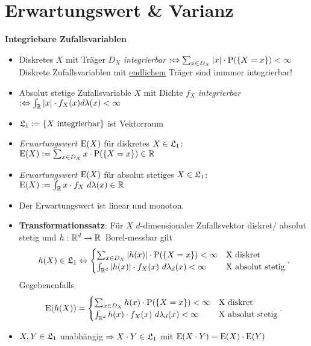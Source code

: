 \section{Erwartungswert \& Varianz}

\textbf{Integriebare Zufallsvariablen}
\begin{itemize}
\item Diskretes $X$ mit Träger $D_X$ \textit{integrierbar}
$:\Leftrightarrow \sum_{x\in D_X} |x|\cdot \P(\{X=x\})<\infty$\\
Diskrete Zufallsvariablen mit \underline{endlichem} Träger sind immmer integrierbar!

\item  Absolut stetige Zufallsvariable $X$ mit Dichte $f_X$ \textit{integrierbar}
\mbox{$:\Leftrightarrow \int_\R |x|\cdot f_X(x)d\lambda(x)<\infty$}

\item $\L_1:=\{X \text{ integrierbar}\}$ ist Vektorraum

\item \textit{Erwartungswert $\E(X)$} für diskretes $X\in\L_1$:
$\E(X):= \sum_{x\in D_X} x\cdot\P(\{X=x\})\in\R$

\item \textit{Erwartungswert $\E(X)$} für absolut stetiges $X\in\L_1$:
$\E(X):= \int_\R x\cdot f_X~d\lambda(x)\in\R$

\item Der Erwartungswert ist linear und monoton.

\item \textbf{Transformationssatz}: Für $X$ $d$-dimensionaler Zufallsvektor diskret/
absolut stetig und \mbox{$h:\R^d\to\R$ Borel-messbar} gilt
\[
	h(X)\in\L_1 \Leftrightarrow
	\begin{cases}
	\sum_{x\in D_X} |h(x)|\cdot\P(\{X=x\})<\infty			& \text{X diskret} \\
	\int_{\R^d} |h(x)|\cdot f_X(x)~d\lambda_d(x)<\infty	& \text{X absolut stetig}
	\end{cases}.
\]
Gegebenenfalls
\[
	\E(h(X))=
	\begin{cases}
	\sum_{x\in D_X} h(x)\cdot\P(\{X=x\})<\infty			& \text{X diskret} \\
	\int_{\R^d} h(x)\cdot f_X(x)~d\lambda_d(x)<\infty		& \text{X absolut stetig}
	\end{cases}.
\]

\item $X,Y\in\L_1$ unabhängig $\Rightarrow X\cdot Y\in\L_1$ mit
$\E(X\cdot Y) = \E(X)\cdot \E(Y)$

\end{itemize}
\hspace{3em}

